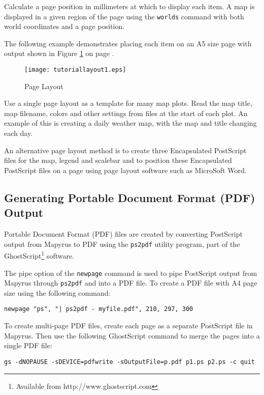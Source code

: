 Calculate a page position in millimeters at which to display each item.
A map is displayed in a given region of the page using
the \texttt{worlds} command with both world coordinates
and a page position.

The following example demonstrates placing each item on an A5 size
page with output shown in Figure \ref{tutoriallayout1}
on page \pageref{tutoriallayout1}.



\begin{figure}[htb]
\texttt{[image: tutoriallayout1.eps]}
\caption{Page Layout}
\label{tutoriallayout1}
\end{figure}

Use a single page layout as a template for many map plots.  Read the map title,
map filename, colors and other settings from files at the start of each plot.
An example of this is creating a daily weather map, with the map and title
changing each day.

An alternative page layout method is to create three Encapsulated PostScript
files for the map, legend and scalebar and to position these Encapsulated
PostScript files on a page using page layout software such as MicroSoft Word.

\subsection{Generating Portable Document Format (PDF) Output}
\label{pdf}


Portable Document Format (PDF) files are created by converting PostScript
output from Mapyrus to PDF using the \texttt{ps2pdf} utility program, part of
the GhostScript\footnote{Available from http://www.ghostscript.com} software.

The pipe option of the \texttt{newpage} command is used to pipe PostScript
output from Mapyrus through \texttt{ps2pdf} and into a PDF file.  To create
a PDF file with A4 page size using the following command:

\begin{verbatim}
newpage "ps", "| ps2pdf - myfile.pdf", 210, 297, 300
\end{verbatim}

To create multi-page PDF files, create each page as a separate
PostScript file in Mapyrus.  Then use the following GhostScript command to
merge the pages into a single PDF file:

\begin{verbatim}
gs -dNOPAUSE -sDEVICE=pdfwrite -sOutputFile=p.pdf p1.ps p2.ps -c quit
\end{verbatim}

